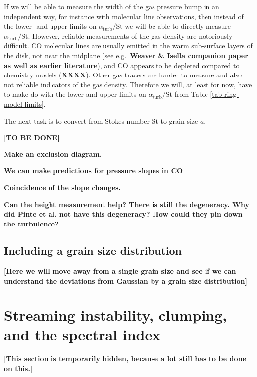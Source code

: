 \documentclass{aa}
\begin{document}
If we will be able to measure the width of the gas pressure bump in an
independent way, for instance with molecular line observations, then instead of
the lower- and upper limits on $\alpha_{\mathrm{turb}}/\mathrm{St}$ we will be
able to directly measure $\alpha_{\mathrm{turb}}/\mathrm{St}$. However, reliable
measurements of the gas density are notoriously difficult. CO molecular lines
are usually emitted in the warm sub-surface layers of the disk, not near the
midplane (see e.g.~{\bf Weaver \& Isella companion paper as well as earlier
  literature}), and CO appears to be depleted compared to chemistry models
({\bf XXXX}). Other gas tracers are harder to measure and also not reliable
indicators of the gas density. Therefore we will, at least for now, have to
make do with the lower and upper limits on $\alpha_{\mathrm{turb}}/\mathrm{St}$
from Table \ref{tab-ring-model-limits}.

The next task is to convert from Stokes number $\mathrm{St}$ to grain size
$a$. 

{\bf [TO BE DONE]}


{\bf Make an exclusion diagram.}



{\bf We can make predictions for pressure slopes in CO}


{\bf Coincidence of the slope changes.}


{\bf Can the height measurement help? There is still the degeneracy. Why did
Pinte et al. not have this degeneracy? How could they pin down the turbulence?}

\subsection{Including a grain size distribution}
%

{\bf [Here we will move away from a single grain size and see if we can understand
the deviations from Gaussian by a grain size distribution]}



\section{Streaming instability, clumping, and the spectral index}
\label{sec-si-clump}
%

{\bf [This section is temporarily hidden, because a lot still has to be
done on this.]}
\end{document}
